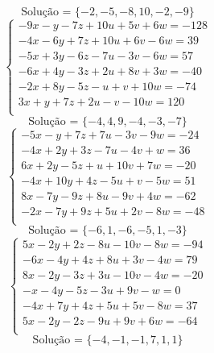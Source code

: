 \documentclass[12pt,oneside,a4paper]{article}
\begin{document}
\begin{equation*}
\text{Solução = }\{-2,-5,-8,10,-2,-9\}
\end{equation*}
\vspace{\baselineskip}
\begin{equation*}
\begin{cases}
-9x-y-7z+10u+5v+6w=-128 \\
-4x-6y+7z+10u+6v-6w=39 \\
-5x+3y-6z-7u-3v-6w=57 \\
-6x+4y-3z+2u+8v+3w=-40 \\
-2x+8y-5z-u+v+10w=-74 \\
3x+y+7z+2u-v-10w=120 \\
\end{cases}
\end{equation*}
\begin{equation*}
\text{Solução = }\{-4,4,9,-4,-3,-7\}
\end{equation*}
\vspace{\baselineskip}
\begin{equation*}
\begin{cases}
-5x-y+7z+7u-3v-9w=-24 \\
-4x+2y+3z-7u-4v+w=36 \\
6x+2y-5z+u+10v+7w=-20 \\
-4x+10y+4z-5u+v-5w=51 \\
8x-7y-9z+8u-9v+4w=-62 \\
-2x-7y+9z+5u+2v-8w=-48 \\
\end{cases}
\end{equation*}
\begin{equation*}
\text{Solução = }\{-6,1,-6,-5,1,-3\}
\end{equation*}
\vspace{\baselineskip}
\begin{equation*}
\begin{cases}
5x-2y+2z-8u-10v-8w=-94 \\
-6x-4y+4z+8u+3v-4w=79 \\
8x-2y-3z+3u-10v-4w=-20 \\
-x-4y-5z-3u+9v-w=0 \\
-4x+7y+4z+5u+5v-8w=37 \\
5x-2y-2z-9u+9v+6w=-64 \\
\end{cases}
\end{equation*}
\begin{equation*}
\text{Solução = }\{-4,-1,-1,7,1,1\}
\end{equation*}
\end{document}
